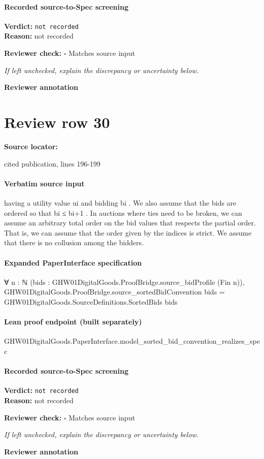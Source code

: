 \documentclass[10pt]{article}
\newcommand{\reviewerbox}{%
  \par\noindent\fbox{\parbox{0.96\linewidth}{\rule{0pt}{0.38in}}}\par
}
\newcommand{\reviewmatch}[1]{%
  \par\noindent\textbf{Reviewer check:} $\square$\; #1\par
  \noindent\emph{If left unchecked, explain the discrepancy or uncertainty below.}\par
}
\begin{document}
\paragraph{Recorded source-to-Spec screening}
\textbf{Verdict:} \texttt{not recorded}
\\
\textbf{Reason:} not recorded
\reviewmatch{Matches source input}
\noindent\textbf{Reviewer annotation}\par
\reviewerbox
\clearpage
\hypertarget{source-claim-3bc5d96e39ab913a}{}
\section*{Review row 30}
\textbf{Source locator:} {\footnotesize\raggedright cited publication, lines 196-\allowbreak{}199\par}
\paragraph{Verbatim source input}
\begin{ReviewVerbatim}
having a utility value ui and bidding bi . We also assume that the bids are ordered so that bi ≤ bi+1 . In
auctions where ties need to be broken, we can assume an arbitrary total order on the bid values that
respects the partial order. That is, we can assume
that the order given by the indices is strict. We assume that there is no collusion among the bidders.
\end{ReviewVerbatim}


\paragraph{Expanded PaperInterface specification}
\begin{ReviewVerbatim}
∀ {n : ℕ} (bids : GHW01DigitalGoods.ProofBridge.source_bidProfile (Fin n)),
  GHW01DigitalGoods.ProofBridge.source_sortedBidConvention bids = GHW01DigitalGoods.SourceDefinitions.SortedBids bids
\end{ReviewVerbatim}

\paragraph{Lean proof endpoint (built separately)}\begin{ReviewVerbatim}
GHW01DigitalGoods.PaperInterface.model_sorted_bid_convention_realizes_spec
\end{ReviewVerbatim}

\paragraph{Recorded source-to-Spec screening}
\textbf{Verdict:} \texttt{not recorded}
\\
\textbf{Reason:} not recorded
\reviewmatch{Matches source input}
\noindent\textbf{Reviewer annotation}\par
\reviewerbox
\clearpage
\hypertarget{source-claim-6a520bdced8a8b28}{}
\end{document}
